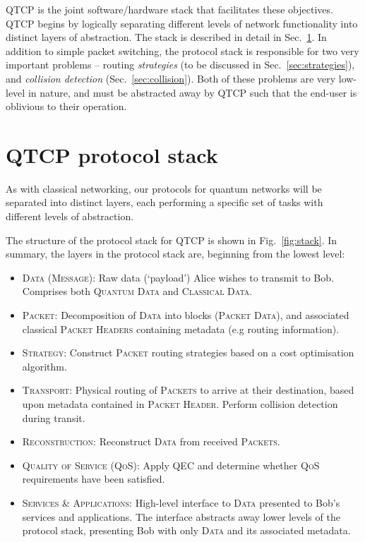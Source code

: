 \documentclass[aps, rmp, twocolumn, amsmath, amssymb, nofootinbib, superscriptaddress, longbibliography, floatfix, table-of-contents, eqsecnum]{revtex4-1}
\begin{document}
QTCP is the joint software/hardware stack that facilitates these objectives. QTCP begins by logically separating different levels of network functionality into distinct layers of abstraction. The stack is described in detail in Sec.~\ref{sec:prot_stack}. In addition to simple packet switching, the protocol stack is responsible for two very important problems -- routing \textit{strategies} (to be discussed in Sec.~\ref{sec:strategies}), and \textit{collision detection} (Sec.~\ref{sec:collision}). Both of these problems are very low-level in nature, and must be abstracted away by QTCP such that the end-user is oblivious to their operation.

%
%

\section{QTCP protocol stack} \label{sec:prot_stack} 

As with classical networking, our protocols for quantum networks will be separated into distinct layers, each performing a specific set of tasks with different levels of abstraction.

The structure of the protocol stack for QTCP is shown in Fig.~\ref{fig:stack}. In summary, the layers in the protocol stack are, beginning from the lowest level:
\begin{itemize}
\item \textsc{Data (Message)}: Raw data (`payload') Alice wishes to transmit to Bob. Comprises both \textsc{Quantum Data} and \textsc{Classical Data}.
\item \textsc{Packet}: Decomposition of \textsc{Data} into blocks (\textsc{Packet Data}), and associated classical \textsc{Packet Headers} containing metadata (e.g routing information).
\item \textsc{Strategy}: Construct \textsc{Packet} routing strategies based on a cost optimisation algorithm.
\item \textsc{Transport}: Physical routing of \textsc{Packets} to arrive at their destination, based upon metadata contained in \textsc{Packet Header}. Perform collision detection during transit.
\item \textsc{Reconstruction}: Reconstruct \textsc{Data} from received \textsc{Packets}.
\item \textsc{Quality of Service (QoS)}: Apply QEC and determine whether \textsc{QoS} requirements have been satisfied.
\item \textsc{Services \& Applications}: High-level interface to \textsc{Data} presented to Bob's services and applications. The interface abstracts away lower levels of the protocol stack, presenting Bob with only \textsc{Data} and its associated metadata.
\end{itemize}
\end{document}
